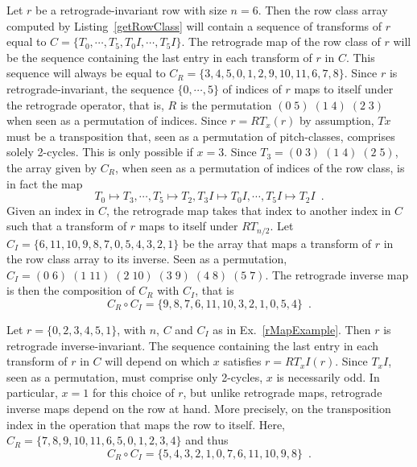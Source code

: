 \begin{example}
\label{rMapExample}
Let $r$ be a retrograde-invariant row with size $n = 6$. Then the row class array computed by Listing~\ref{getRowClass} will contain a sequence of transforms of $r$ equal to $C = \{T_0, \cdots, T_5, T_0I, \cdots, T_5I\}$. The retrograde map of the row class of $r$ will be the sequence containing the last entry in each transform of $r$ in $C$. This sequence will always be equal to $C_R = \{3, 4, 5, 0, 1, 2, 9, 10, 11, 6, 7, 8\}$. Since $r$ is retrograde-invariant, the sequence $\{0, \cdots, 5\}$ of indices of $r$ maps to itself under the retrograde operator, that is, $R$ is the permutation $(0 \; 5) \; (1 \; 4) \; (2 \; 3)$ when seen as a permutation of indices. Since $r = RT_x(r)$ by assumption, $Tx$ must be a transposition that, seen as a permutation of pitch-classes, comprises solely 2-cycles. This is only possible if $x = 3$. Since $T_3 = (0 \; 3) \; (1 \; 4) \; (2 \; 5)$, the array given by $C_R$, when seen as a permutation of indices of the row class, is in fact the map
\begin{equation}
	T_0 \mapsto T_3, \cdots, T_5 \mapsto T_2, T_3I \mapsto T_0I, \cdots, T_5I \mapsto T_2I \enspace.
\end{equation}
Given an index in $C$, the retrograde map takes that index to another index in $C$ such that a transform of $r$ maps to itself under $RT_{n / 2}$. Let $C_I = \{6, 11, 10, 9, 8, 7, 0, 5, 4, 3, 2, 1\}$ be the array that maps a transform of $r$ in the row class array to its inverse. Seen as a permutation, $C_I = (0 \; 6) \; (1 \; 11) \; (2 \; 10) \; (3 \; 9) \; (4 \; 8) \; (5 \; 7)$. The retrograde inverse map is then the composition of $C_R$ with $C_I$, that is
\begin{equation}
	C_R \circ C_I = \{9, 8, 7, 6, 11, 10, 3, 2, 1, 0, 5, 4\} \enspace.
\end{equation}
\end{example}

\begin{example}
Let $r = \{0, 2, 3, 4, 5, 1\}$, with $n$, $C$ and $C_I$ as in Ex.~\ref{rMapExample}. Then $r$ is retrograde inverse-invariant. The sequence containing the last entry in each transform of $r$ in $C$ will depend on which $x$ satisfies $r = RT_xI(r)$. Since $T_xI$, seen as a permutation, must comprise only 2-cycles, $x$ is necessarily odd. In particular, $x = 1$ for this choice of $r$, but unlike retrograde maps, retrograde inverse maps depend on the row at hand. More precisely, on the transposition index in the operation that maps the row to itself. Here, $C_R = \{7, 8, 9, 10, 11, 6, 5, 0, 1, 2, 3, 4\}$ and thus
\begin{equation}
	C_R \circ C_I = \{5, 4, 3, 2, 1, 0, 7, 6, 11, 10, 9, 8\} \enspace.
\end{equation}
\end{example}

